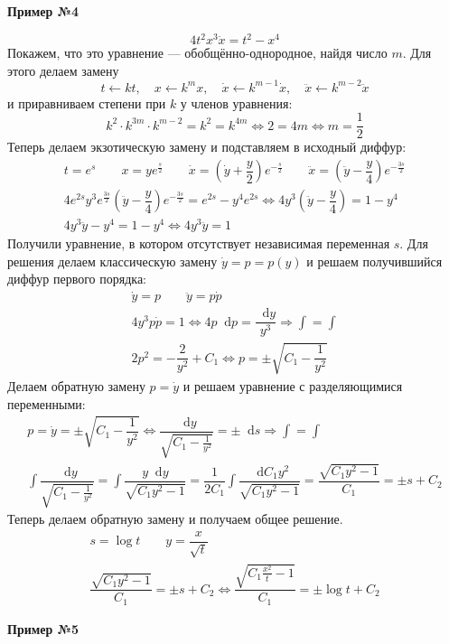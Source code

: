 \documentclass[a4paper,12pt]{article}
\renewcommand*\d{\mathop{}\!\mathrm{d}}
\newcommand{\dy}{\dot{y}}
\newcommand{\ddy}{\ddot{y}}
\newcommand{\dpp}{\dot{p}}
\newcommand{\dx}{\dot{x}}
\newcommand{\ddx}{\ddot{x}}
\newcommand{\bto}{\Longrightarrow}
\newcommand{\ds}{\displaystyle}
\begin{document}
\textbf{Пример №4}

\[4t^2x^3\ddx = t^2 - x^4\]
Покажем, что это уравнение --- обобщённо-однородное, найдя число $m$. Для этого делаем замену 
\[t\leftarrow kt,\quad x \leftarrow k^mx,\quad \dx \leftarrow k^{m - 1}\dx,\quad \ddx \leftarrow k^{m - 2}\ddx\]
и приравниваем степени при $k$ у членов уравнения:
\[k^2\cdot k^{3m} \cdot k^{m - 2} = k^2 = k^{4m} \iff 2 = 4m \iff m = \dfrac{1}{2}\]
Теперь делаем экзотическую замену и подставляем в исходный диффур:
\begin{gather*}
	t = e^s\qquad x = ye^{\frac{s}{2}} \qquad \dx = \left(\dy + \dfrac{y}{2}\right)e^{-\frac{s}{2}} \qquad \ddx = \left(\ddy - \dfrac{y}{4}\right)e^{-\frac{3s}{2}}\\
	4e^{2s}y^3e^{\frac{3s}{2}}\left(\ddy - \dfrac{y}{4}\right)e^{-\frac{3s}{2}} = e^{2s} - y^4e^{2s} \iff 4y^3 \left(\ddy - \dfrac{y}{4}\right) = 1 - y^4\\
	4y^3\ddy - y^4 = 1 - y^4 \iff 4y^3\ddy = 1
\end{gather*}
Получили уравнение, в котором отсутствует независимая переменная $s$. Для решения делаем классическую замену $\dy = p = p(y)$ и решаем получившийся диффур первого порядка:
\begin{gather*}
	\dy = p \qquad \ddy = p\dpp\\
	4y^3p\dpp = 1 \iff 4p\d p = \dfrac{\d y}{y^3} \bto \ds\int = \int\\
	2p^2 = -\dfrac{2}{y^2} + C_1 \iff p = \pm\sqrt{C_1 -\dfrac{1}{y^2}}
\end{gather*}
Делаем обратную замену $p = \dy$ и решаем уравнение с разделяющимися переменными:
\begin{gather*}
	p = \dy = \pm\sqrt{C_1 -\dfrac{1}{y^2}} \iff \dfrac{\d y}{\sqrt{C_1 -\frac{1}{y^2}} } = \pm\d s \bto \ds\int = \int\\
	\ds\int\dfrac{\d y}{\sqrt{C_1 -\frac{1}{y^2}} } = \ds\int \dfrac{y\d y}{\sqrt{C_1y^2 - 1}} = \dfrac{1}{2C_1}\ds\int \dfrac{\d C_1y^2}{\sqrt{C_1y^2 - 1}} = \dfrac{\sqrt{C_1y^2 - 1}}{C_1} = \pm s + C_2
\end{gather*}
Теперь делаем обратную замену и получаем общее решение.
\[\begin{gathered}
	s = \log t \qquad y = \dfrac{x}{\sqrt{t}}\\
	\dfrac{\sqrt{C_1y^2 - 1}}{C_1} = \pm s + C_2 \iff \dfrac{\sqrt{C_1\frac{x^2}{t} - 1}}{C_1} = \pm \log t + C_2
\end{gathered}\]

\textbf{Пример №5}
\end{document}
